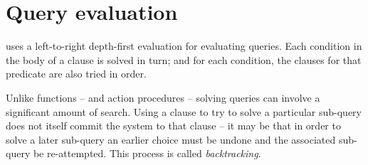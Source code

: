 \section{Query evaluation}
\label{relation:evaluation}
\go uses a left-to-right depth-first evaluation for evaluating queries. Each condition in the body of a clause is solved in turn; and for each condition, the clauses for that predicate are also tried in order.

Unlike functions -- and action procedures -- solving queries can involve a significant amount of search. Using a clause to try to solve a particular sub-query does not itself commit the system to that clause -- it may be that in order to solve a later sub-query an earlier choice must be undone and the associated sub-query be re-attempted. This process is called \emph{backtracking}.


